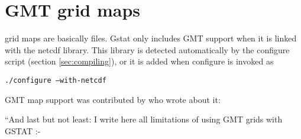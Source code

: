 \documentclass[a4paper,12pt]{book}
\newcommand{\code}[1]{\texttt{#1}}
\begin{document}
\section{GMT grid maps}

 grid maps are 
basically 
files. Gstat only includes GMT support when it is linked with the netcdf
library. This library is detected automatically by the configure script
(section \ref{sec:compiling}), or it is added when configure is invoked as

\code{./configure --with-netcdf}

GMT map support was contributed by  who wrote about it:

``And last but not least: I write here all limitations of using GMT 
grids with GSTAT :-
\end{document}
